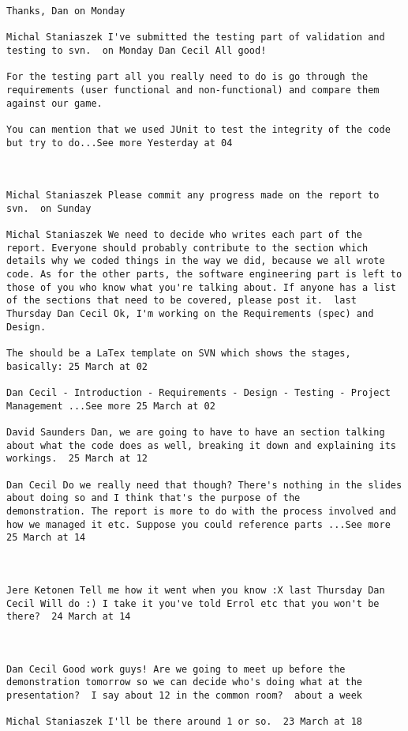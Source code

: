\begin{verbatim}
Thanks, Dan on Monday

Michal Staniaszek I've submitted the testing part of validation and
testing to svn.  on Monday Dan Cecil All good!

For the testing part all you really need to do is go through the
requirements (user functional and non-functional) and compare them
against our game.

You can mention that we used JUnit to test the integrity of the code
but try to do...See more Yesterday at 04



Michal Staniaszek Please commit any progress made on the report to
svn.  on Sunday

Michal Staniaszek We need to decide who writes each part of the
report. Everyone should probably contribute to the section which
details why we coded things in the way we did, because we all wrote
code. As for the other parts, the software engineering part is left to
those of you who know what you're talking about. If anyone has a list
of the sections that need to be covered, please post it.  last
Thursday Dan Cecil Ok, I'm working on the Requirements (spec) and
Design.

The should be a LaTex template on SVN which shows the stages,
basically: 25 March at 02

Dan Cecil ‎- Introduction - Requirements - Design - Testing - Project
Management ...See more 25 March at 02

David Saunders Dan, we are going to have to have an section talking
about what the code does as well, breaking it down and explaining its
workings.  25 March at 12

Dan Cecil Do we really need that though? There's nothing in the slides
about doing so and I think that's the purpose of the
demonstration. The report is more to do with the process involved and
how we managed it etc. Suppose you could reference parts ...See more
25 March at 14



Jere Ketonen Tell me how it went when you know :X last Thursday Dan
Cecil Will do :) I take it you've told Errol etc that you won't be
there?  24 March at 14



Dan Cecil Good work guys! Are we going to meet up before the
demonstration tomorrow so we can decide who's doing what at the
presentation?  I say about 12 in the common room?  about a week 

Michal Staniaszek I'll be there around 1 or so.  23 March at 18


\end{verbatim}
